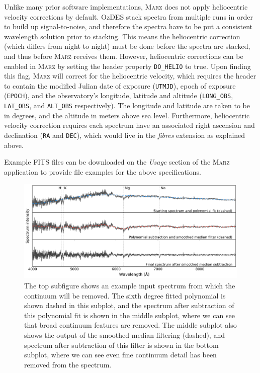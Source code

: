 \documentclass[5p]{elsarticle}
\newcommand{\marz}{\textsc{Marz}}
\begin{document}
Unlike many prior software implementations, \marz{} does not apply heliocentric velocity corrections by default. OzDES stack spectra from multiple runs in order to build up signal-to-noise, and therefore the spectra have to be put a consistent wavelength solution prior to stacking. This means the heliocentric correction (which differs from night to night) must be done before the spectra are stacked, and thus before \marz{} receives them. However, heliocentric corrections can be enabled in \marz{} by setting the header property \verb;DO_HELIO; to true. Upon finding this flag, \marz{} will correct for the heliocentric velocity, which requires the header to contain the modified Julian date of exposure (\verb;UTMJD;), epoch of exposure (\verb;EPOCH;), and the observatory's longitude, latitude and altitude (\verb;LONG_OBS;, \verb;LAT_OBS;, and \verb;ALT_OBS; respectively). The longitude and latitude are taken to be in degrees, and the altitude in meters above sea level. Furthermore, heliocentric velocity correction requires each spectrum have an associated right ascension and declination (\verb;RA; and \verb;DEC;), which would live in the \textit{fibres} extension as explained above.

Example FITS files can be downloaded on the \textit{Usage} section of the \marz{} application to provide file examples for the above specifications.









\begin{figure}[t]
\centering
\includegraphics[width=\textwidth]{continuum.pdf}
\caption{The top subfigure shows an example input spectrum from which the continuum will be removed. The sixth degree fitted polynomial is shown dashed in this subplot, and the spectrum after subtraction of this polynomial fit is shown in the middle subplot, where we can see that broad continuum features are removed. The middle subplot also shows the output of the smoothed median filtering (dashed), and spectrum after subtraction of this filter is shown in the bottom subplot, where we can see even fine continuum detail has been removed from the spectrum.}
\label{fig:continuum}
\end{figure}
\end{document}

